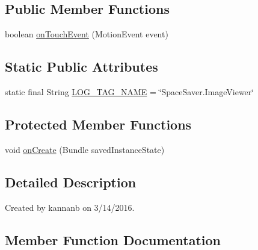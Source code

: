 \subsection*{Public Member Functions}
\begin{DoxyCompactItemize}
\item 
boolean \hyperlink{classcourse_1_1examples_1_1spacesaver_1_1_image_viewer_a1b01127ae6b5efe2d351adbacd678435}{on\+Touch\+Event} (Motion\+Event event)
\end{DoxyCompactItemize}
\subsection*{Static Public Attributes}
\begin{DoxyCompactItemize}
\item 
static final String \hyperlink{classcourse_1_1examples_1_1spacesaver_1_1_image_viewer_af01160015f24efaa8925b71c742633b7}{L\+O\+G\+\_\+\+T\+A\+G\+\_\+\+N\+A\+M\+E} = \char`\"{}Space\+Saver.\+Image\+Viewer\char`\"{}
\end{DoxyCompactItemize}
\subsection*{Protected Member Functions}
\begin{DoxyCompactItemize}
\item 
void \hyperlink{classcourse_1_1examples_1_1spacesaver_1_1_image_viewer_a6bcc20e17948af4e83864323bf8aafd3}{on\+Create} (Bundle saved\+Instance\+State)
\end{DoxyCompactItemize}


\subsection{Detailed Description}
Created by kannanb on 3/14/2016. 

\subsection{Member Function Documentation}
\hypertarget{classcourse_1_1examples_1_1spacesaver_1_1_image_viewer_a6bcc20e17948af4e83864323bf8aafd3}{}
